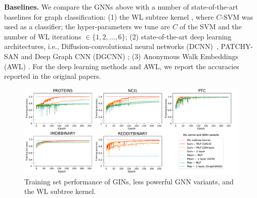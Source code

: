 {\bf Baselines.}
We compare the GNNs above with a number of state-of-the-art baselines for graph classification: 
(1) the WL subtree kernel \citep{shervashidze2011weisfeiler}, where $C$-SVM \citep{chang2011libsvm} was used as a classifier; the hyper-parameters we tune are $C$ of the SVM and the number of WL iterations $\in \{1, 2, \ldots, 6\}$; (2) state-of-the-art deep learning architectures, i.e., Diffusion-convolutional neural networks (DCNN)~\citep{atwood2016diffusion}, PATCHY-SAN \citep{niepert2016learning} and Deep Graph CNN (DGCNN) \citep{zhang2018end}; (3) Anonymous Walk Embeddings (AWL) \citep{ivanov2018anonymous}. For the deep learning methods and AWL, we report the accuracies reported in the original papers.


\begin{figure}[t]
 \vspace{-0.15in}
    \centering
        \includegraphics[width=\textwidth]{learning_curve.pdf}   
    \caption{Training set performance of GINs, less powerful GNN variants, and the WL subtree kernel. 
    }
    \label{fig:curve}
\end{figure}

